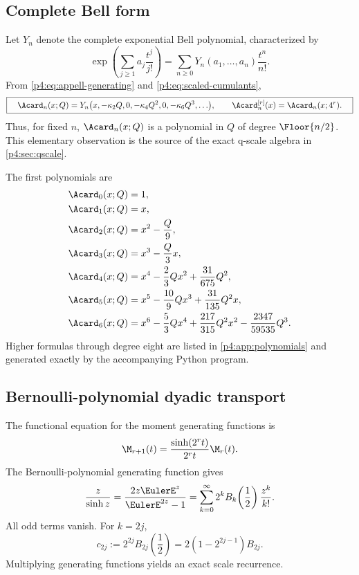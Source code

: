 \documentclass[11pt]{article}
\numberwithin{equation}{section}
\theoremstyle{definition}
\theoremstyle{remark}
\begin{document}
\subsection{Complete Bell form}
Let $Y_n$ denote the complete exponential Bell polynomial, characterized by
\[
 \exp\!\left(\sum_{j\ge1}a_j\frac{t^j}{j!}\right)
 =\sum_{n\ge0}Y_n(a_1,\ldots,a_n)\frac{t^n}{n!}.
\]
From \eqref{p4:eq:appell-generating} and \eqref{p4:eq:scaled-cumulants},
\begin{equation}
 \boxed{\quad
 \Acard_n(x;Q)
 =Y_n\bigl(x,-\kappa_2Q,0,-\kappa_4Q^2,0,-\kappa_6Q^3,\ldots\bigr),
 \qquad \Acard_n^{[r]}(x)=\Acard_n(x;4^r).
 \quad}
 \label{p4:eq:bell-appell}
\end{equation}
Thus, for fixed $n$, $\Acard_n(x;Q)$ is a polynomial in $Q$ of degree $\Floor{n/2}$.  This elementary observation is the source of the exact q-scale algebra in \cref{p4:sec:qscale}.

The first polynomials are
\begin{align}
 \Acard_0(x;Q)&=1,\\
 \Acard_1(x;Q)&=x,\\
 \Acard_2(x;Q)&=x^2-\frac Q9,\\
 \Acard_3(x;Q)&=x^3-\frac Q3x,\\
 \Acard_4(x;Q)&=x^4-\frac23Qx^2+\frac{31}{675}Q^2,\\
 \Acard_5(x;Q)&=x^5-\frac{10}{9}Qx^3+\frac{31}{135}Q^2x,\\
 \Acard_6(x;Q)&=x^6-\frac53Qx^4+\frac{217}{315}Q^2x^2-\frac{2347}{59535}Q^3.
 \label{p4:eq:first-appell-polys}
\end{align}
Higher formulas through degree eight are listed in \cref{p4:app:polynomials} and generated exactly by the accompanying Python program.

\subsection{Bernoulli-polynomial dyadic transport}
The functional equation for the moment generating functions is
\begin{equation}
 \M_{r+1}(t)=\frac{\sinh(2^rt)}{2^rt}\M_r(t).
 \label{p4:eq:mgf-scale}
\end{equation}
The Bernoulli-polynomial generating function gives
\begin{equation}
 \frac z{\sinh z}
 =\frac{2z\EulerE^z}{\EulerE^{2z}-1}
 =\sum_{k=0}^{\infty}2^kB_k\!\left(\frac12\right)\frac{z^k}{k!}.
 \label{p4:eq:bernoulli-half}
\end{equation}
All odd terms vanish.  For $k=2j$,
\begin{equation}
 c_{2j}:=2^{2j}B_{2j}\!\left(\frac12\right)
 =2(1-2^{2j-1})B_{2j}.
 \label{p4:eq:c2j}
\end{equation}
Multiplying generating functions yields an exact scale recurrence.
\end{document}
